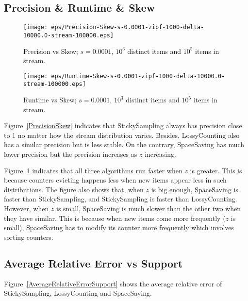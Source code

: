 \documentclass[10pt]{article}
\begin{document}
\subsection{Precision \& Runtime \& Skew}

\begin{figure}[H]
      \begin{minipage}{0.48\textwidth}
        \centering
        \texttt{[image: eps/Precision-Skew-s-0.0001-zipf-1000-delta-10000.0-stream-100000.eps]}
        \caption{Precision vs Skew; $s=0.0001$, $10^3$ distinct items and $10^5$ items in stream.}
        \label{PrecisionSkew}
      \end{minipage}\hfill
      \begin{minipage}{0.48\textwidth}
        \centering
        \texttt{[image: eps/Runtime-Skew-s-0.0001-zipf-1000-delta-10000.0-stream-100000.eps]}
        \caption{Runtime vs Skew; $s=0.0001$, $10^3$ distinct items and $10^5$ items in stream.}
        \label{RuntimeSkew}
      \end{minipage}
\end{figure}

Figure~\ref{PrecisionSkew} indicates that 
StickySampling always has precision close to 1 no matter how the 
stream distribution varies. 
Besides, LossyCounting also has a similar precision but is less stable.
On the contrary, SpaceSaving has much lower precision but the precision
increases as $z$ increasing.

Figure~\ref{RuntimeSkew} indicates that all three algorithms run faster
when $z$ is greater. This is because counters evicting happens less
when new items appear less in such distributions. 
The figure also shows that, when $z$ is big enough, SpaceSaving is faster than StickySampling, 
and StickySampling is faster than LossyCounting. 
However, when $z$ is small, SpaceSaving is much slower than the other two when they have
similar. 
This is because when new items come more frequently ($z$ is small),
SpaceSaving has to modify its counter more frequently which involves sorting counters.

\subsection{Average Relative Error vs Support}
Figure~\ref{AverageRelativeErrorSupport} shows the average relative error of StickySampling, LossyCounting and SpaceSaving.
\end{document}
